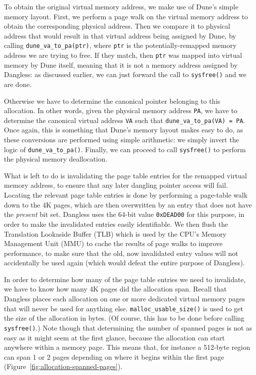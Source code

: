 To obtain the original virtual memory address, we make use of Dune's simple memory layout. First, we perform a page walk on the virtual memory address to obtain the corresponding physical address. Then we compare it to physical address that would result in that virtual address being assigned by Dune, by calling \lstinline!dune_va_to_pa(ptr)!, where \lstinline!ptr! is the potentially-remapped memory address we are trying to free.
If they match, then \lstinline!ptr! was mapped into virtual memory by Dune itself, meaning that it is not a memory address assigned by Dangless: as discussed earlier, we can just forward the call to \lstinline!sysfree()! and we are done.

Otherwise we have to determine the canonical pointer belonging to this allocation. In other words, given the physical memory address \lstinline!PA!, we have to determine the canonical virtual address \lstinline!VA! such that \lstinline!dune_va_to_pa(VA) = PA!. Once again, this is something that Dune's memory layout makes easy to do, as these conversions are performed using simple arithmetic: we simply invert the logic of \lstinline!dune_va_to_pa()!. Finally, we can proceed to call \lstinline!sysfree()! to perform the physical memory deallocation.

What is left to do is invalidating the page table entries for the remapped virtual memory address, to ensure that any later dangling pointer access will fail. Locating the relevant page table entries is done by performing a page-table walk down to the 4K pages, which are then overwritten by an entry that does not have the \emph{present} bit set. Dangless uses the 64-bit value \lstinline!0xDEAD00! for this purpose, in order to make the invalidated entries easily identifiable. We then flush the Translation Lookaside Buffer (TLB) which is used by the CPU's Memory Management Unit (MMU) to cache the results of page walks to improve performance, to make sure that the old, now invalidated entry values will not accidentally be used again (which would defeat the entire purpose of Dangless).

In order to determine how many of the page table entries we need to invalidate, we have to know how many 4K pages did the allocation span. Recall that Dangless places each allocation on one or more dedicated virtual memory pages that will never be used for anything else. \lstinline!malloc_usable_size()! is used to get the size of the allocation in bytes. (Of course, this has to be done before calling \lstinline!sysfree()!.) Note though that determining the number of spanned pages is not as easy as it might seem at the first glance, because the allocation can start anywhere within a memory page. This means that, for instance a 512-byte region can span 1 or 2 pages depending on where it begins within the first page (Figure~\ref{fig:allocation-spanned-pages}).

